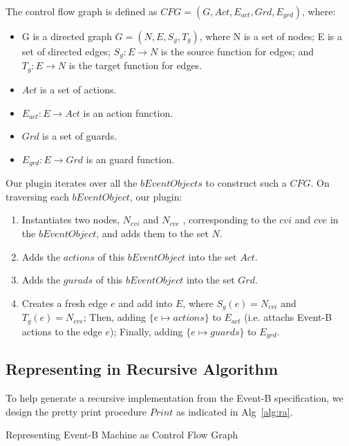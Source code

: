 \documentclass{easychair}
\def\ForEach{\ForAll}
\begin{document}
The control flow graph is defined as $CFG = (G, Act, E_{act}, Grd, E_{grd})$, where:
\begin{itemize}
	\item G is a directed graph $G = (N, E, S_g, T_g)$, where N is a set of nodes; E is a set of directed edges; $S_g : E \rightarrow N $ is the source function for edges; and $T_g : E \rightarrow N$ is the target function for edges.
	\item $Act$ is a set of actions.
	\item $E_{act} : E \rightarrow Act$ is an action function. 
	\item $Grd$ is a set of guards.
	\item $E_{grd} : E \rightarrow Grd$ is an guard function.
\end{itemize}

Our plugin iterates over all the $bEventObjects$ to construct such a $CFG$. On traversing each $bEventObject$, our plugin:
\begin{enumerate}
	\item Instantiates two nodes, $N_{cvi}$ and $N_{cve}$ , corresponding to the $cvi$ and $cve$ in the $bEventObject$, and adds them to the set $N$.
	\item Adds the $actions$ of this $bEventObject$ into the set $Act$.
	\item Adds the $gurads$ of this $bEventObject$ into the set $Grd$.
	\item Creates a fresh edge $e$ and add into $E$, where $S_g(e) = N_{cvi}$ and $T_g(e) = N_{cve}$; Then, adding $\{e \mapsto actions\}$ to $E_{act}$ (i.e. attachs Event-B actions to the edge $e$); Finally, adding $\{e \mapsto guards\}$ to $E_{grd}$.
\end{enumerate}

\subsection{Representing in Recursive Algorithm}\label{subsect:ra}
To help generate a recursive implementation from the Event-B specification, we design the pretty print procedure $Print$ as indicated in Alg~\ref{alg:ra}.

\begin{algorithm}
  \caption{Representing Event-B Machine as Control Flow Graph
    \label{alg:ra}}
  \begin{algorithmic}[1]
    \Statex
        \State {}
        \State {}
      \ForEach{$bEventObject$ $e \in o.nextEvts $}
        \State
      \EndFor
    \EndFunction
  \end{algorithmic}
\end{algorithm}
\end{document}
